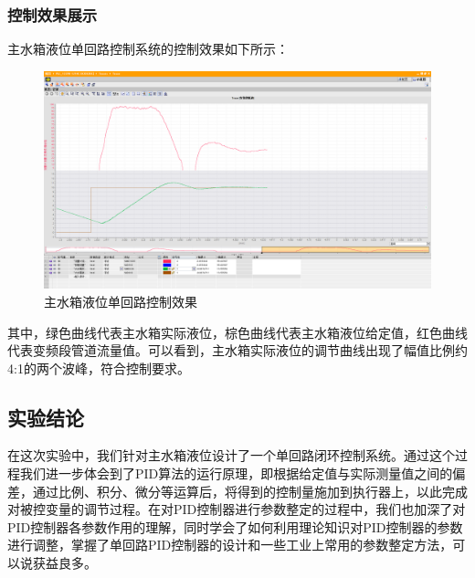 \documentclass[UTF8]{article}
\begin{document}
\subsubsection{控制效果展示}
主水箱液位单回路控制系统的控制效果如下所示：
\begin{figure}[H]
    \centering %
    \includegraphics[width=1\textwidth]{figure/单回路控制效果-模块.png} 
    \caption{主水箱液位单回路控制效果} %
\end{figure}
其中，绿色曲线代表主水箱实际液位，棕色曲线代表主水箱液位给定值，红色曲线代表变频段管道流量值。可以看到，主水箱实际液位的调节曲线出现了幅值比例约4:1的两个波峰，符合控制要求。

\subsection{实验结论}

在这次实验中，我们针对主水箱液位设计了一个单回路闭环控制系统。通过这个过程我们进一步体会到了PID算法的运行原理，即根据给定值与实际测量值之间的偏差，通过比例、积分、微分等运算后，将得到的控制量施加到执行器上，以此完成对被控变量的调节过程。在对PID控制器进行参数整定的过程中，我们也加深了对PID控制器各参数作用的理解，同时学会了如何利用理论知识对PID控制器的参数进行调整，掌握了单回路PID控制器的设计和一些工业上常用的参数整定方法，可以说获益良多。

\end{document}

